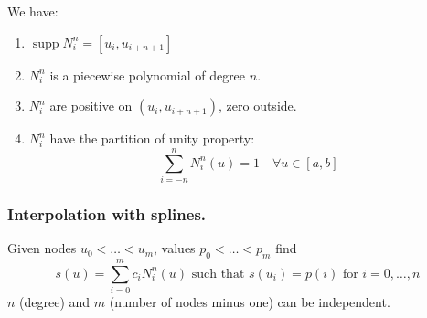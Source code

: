 We have:
\begin{enumerate}
    \item {
        $\operatorname{supp} N_i^n = [u_i, u_{i+n+1}]$
    }
    \item {
        $N_i^n$ is a piecewise polynomial of degree $n$.
    }
    \item {
        $N_i^n$ are positive on $(u_i, u_{i+n+1})$, zero outside.
    }
    \item {
        $N_i^n$ have the partition of unity property:
        \[ \sum_{i=-n}^n N_i^n(u) = 1 \quad \forall u \in [a, b] \]
        \begin{center}   
        \end{center}
    }
\end{enumerate}

\subsubsection*{Interpolation with splines.}
Given nodes $u_0 < \dots < u_m$, values $p_0 < \dots < p_m$
find
\[ s(u) = \sum_{i=0}^m c_i N_i^n(u) \text{ such that } s(u_i) = p(i) \text{ for } i = 0,\dots, n \]
$n$ (degree) and $m$ (number of nodes minus one) can be independent.

